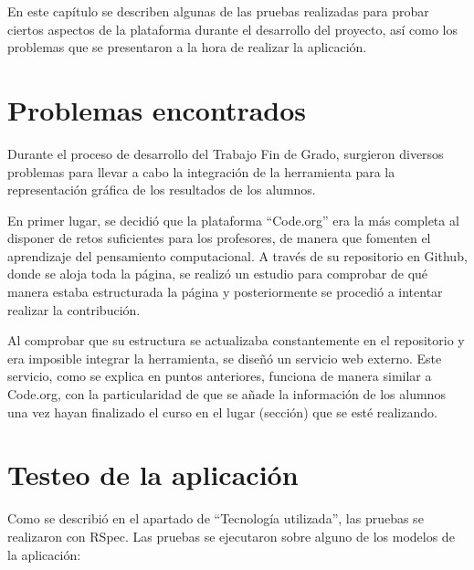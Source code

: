 
En este capítulo se describen algunas de las pruebas realizadas para probar ciertos aspectos de la plataforma durante el desarrollo del proyecto, así como los problemas que se presentaron a la hora de realizar la aplicación.


\section{Problemas encontrados}
\label{5:sec:1}

Durante el proceso de desarrollo del Trabajo Fin de Grado, surgieron diversos problemas para llevar a cabo la integración de la herramienta para la representación gráfica de los resultados de los alumnos.

En primer lugar, se decidió que la plataforma ``Code.org'' era la más completa al disponer de retos suficientes para los profesores, de manera que fomenten el aprendizaje del pensamiento computacional. A través de su repositorio en Github, donde
se aloja toda la página, se realizó un estudio para comprobar de qué manera estaba estructurada la página y posteriormente se procedió a intentar realizar la contribución.

Al comprobar que su estructura se actualizaba constantemente en el repositorio y era imposible integrar la herramienta, se diseñó un servicio web externo. Este servicio, como se explica en puntos anteriores, 
funciona de manera similar a Code.org, con la particularidad de que se añade la información de los alumnos una vez hayan finalizado el curso en el lugar (sección) que se esté realizando.


\section{Testeo de la aplicación}
\label{5:sec:2}

Como se describió en el apartado de ``Tecnología utilizada'', las pruebas se realizaron con RSpec. Las pruebas se ejecutaron sobre alguno de los modelos de la aplicación:

